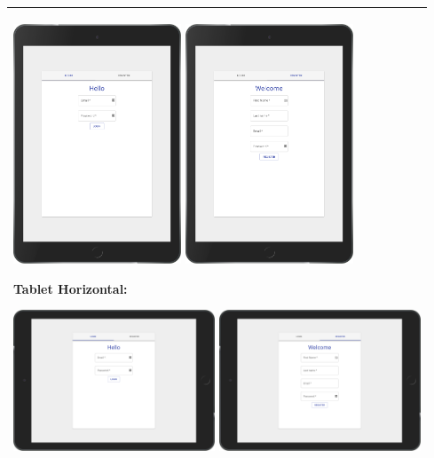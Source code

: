 \documentclass[a4paper]{article}
\newcommand{\colWidth}{141mm}
\begin{document}
\begin{center}
\begin{tabular}{|p{\colWidth}|}
{ \includegraphics[width=5cm]{tablet_v_login.png}
 \includegraphics[width=5cm]{tablet_v_register.png}
 
 Tablet Horizontal:
 
 \includegraphics[width=6cm]{tablet_h_login.png}
 \includegraphics[width=6cm]{tablet_h_register.png}

  }
  \\
  \hline
\end{tabular}
\vskip 5mm


\end{center}
\end{document}
